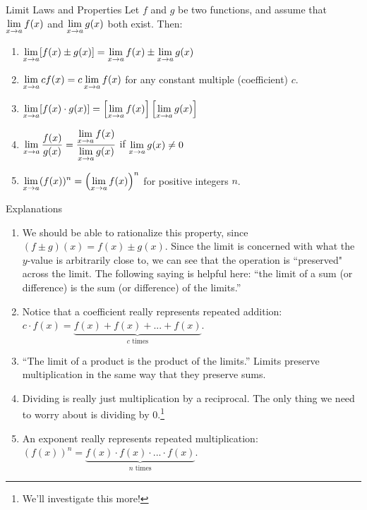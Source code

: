 \begin{imp}{Limit Laws and Properties}
  Let $f$ and $g$ be two functions, and assume that $\displaystyle \lim_{x\to a} f(x)$ and $\displaystyle \lim_{x\to a} g(x)$ both exist.
  Then:
  \begin{enumerate}
    \item $\displaystyle \lim_{x\to a} [f(x)\pm g(x)] = \lim_{x\to a} f(x) \pm \lim_{x\to a} g(x)$
    \item $\displaystyle \lim_{x\to a} cf(x) = c\lim_{x\to a} f(x)$ for any constant multiple (coefficient) $c$.
    \item $\displaystyle \lim_{x\to a} [f(x)\cdot g(x)] = \left[\lim_{x\to a} f(x)\right] \left[\lim_{x\to a} g(x)\right]$
    \item $\displaystyle \lim_{x\to a} \frac{f(x)}{g(x)} = \frac{\displaystyle \lim_{x\to a} f(x)}{\displaystyle \lim_{x\to a} g(x)}$ if $\displaystyle \lim_{x\to a} g(x)\neq0$
    \item $\displaystyle \lim_{x\to a} (f(x))^n = \left(\displaystyle \lim_{x\to a} f(x) \right)^n$ for positive integers $n$.
  \end{enumerate}
\end{imp}

\begin{note}{Explanations}\hspace{1cm}
  \begin{enumerate}
    \item We should be able to rationalize this property, since $(f\pm g)(x)= f(x)\pm g(x)$.
    Since the limit is concerned with what the $y$-value is arbitrarily close to, we can see that the operation is ``preserved" across the limit.
    The following saying is helpful here: ``the limit of a sum (or difference) is the sum (or difference) of the limits.''
    \item Notice that a coefficient really represents repeated addition: $c\cdot f(x) = \underbrace{f(x) + f(x) + ...+ f(x)}_{c \text{ times}}$.
    \item ``The limit of a product is the product of the limits.''
    Limits preserve multiplication in the same way that they preserve sums.
    \item Dividing is really just multiplication by a reciprocal.
    The only thing we need to worry about is dividing by 0.\footnote{We'll investigate this more!}
    \item An exponent really represents repeated multiplication: $(f(x))^n = \underbrace{f(x) \cdot f(x) \cdot ... \cdot f(x)}_{n \text{ times}}$.
  \end{enumerate}
\end{note}

